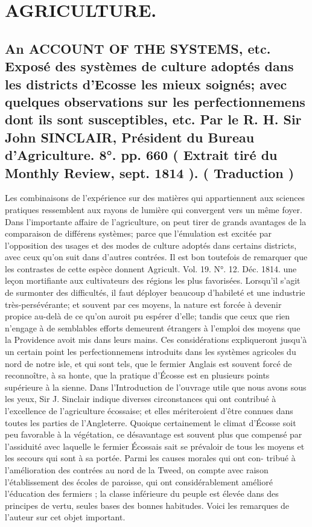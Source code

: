 \setcounter{page}{409}
\chapter{AGRICULTURE.}
\section{An ACCOUNT OF THE SYSTEMS, etc. Exposé des systèmes de culture adoptés dans les districts d'Ecosse les mieux soignés; avec quelques observations sur les perfectionnemens dont ils sont susceptibles, etc. Par le R. H. Sir John SINCLAIR, Président du Bureau d'Agriculture. 8°. pp. 660 ( Extrait tiré du Monthly Review, sept. 1814 ). \large{( Traduction )}}
Les combinaisons de l'expérience sur des matières qui appartiennent aux sciences pratiques ressemblent aux rayons de lumière qui convergent vers un même foyer. Dans l'importante affaire de l'agriculture, on peut tirer de grands avantages de la comparaison de différens systèmes; parce que l'émulation est excitée par l'opposition des usages et des modes de culture adoptés dans certains districts, avec ceux qu'on suit dans d'autres contrées. Il est bon toutefois de remarquer que les contrastes de cette espèce donnent
Agricult. Vol. 19. N°. 12. Déc. 1814.\setcounter{page}{410} une leçon mortifiante aux cultivateurs des régions les plus favorisées. Lorsqu'il s'agit de surmonter des difficultés, il faut déployer beaucoup d'habileté et une industrie très-persévérante; et souvent par ces moyens, la nature est forcée à devenir propice au-delà de ce qu'on auroit pu espérer d'elle; tandis que ceux que rien n'engage à de semblables efforts demeurent étrangers à l'emploi des moyens que la Providence avoit mis dans leurs mains.
Ces considérations expliqueront jusqu'à un certain point les perfectionnemens introduits dans les systèmes agricoles du nord de notre isle, et qui sont tels, que le fermier Anglais est souvent forcé de reconnoître, à sa honte, que la pratique d'Écosse est en plusieurs points supérieure à la sienne.
Dans l'Introduction de l'ouvrage utile que nous avons sous les yeux, Sir J. Sinclair indique diverses circonstances qui ont contribué à l'excellence de l'agriculture écossaise; et elles mériteroient d'être connues dans toutes les parties de l'Angleterre. Quoique certainement le climat d'Écosse soit peu favorable à la végétation, ce désavantage est souvent plus que compensé par l'assiduité avec laquelle le fermier Écossais sait se prévaloir de tous les moyens et les secours qui sont à sa portée. Parmi les causes morales qui ont con-\setcounter{page}{411} tribué à l'amélioration des contrées au nord de la Tweed, on compte avec raison l'établissement des écoles de paroisse, qui ont considérablement amélioré l'éducation des fermiers ; la classe inférieure du peuple est élevée dans des principes de vertu, seules bases des bonnes habitudes. Voici les remarques de l'auteur sur cet objet important.

